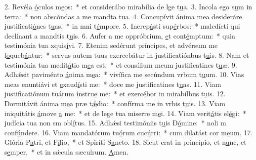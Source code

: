 2. Revéla \uline{ó}culos m\uline{e}os:~* et considerábo mirabília de lge t\uline{u}a.
3. Incola ego s\uline{u}m in t\uline{e}rra:~* non abscóndas a me mandta t\uline{u}a.
4. Concupívit ánima mea desideráre justificati\uline{ó}nes t\uline{u}as,~* in mni t\uline{é}mpore.
5. Increp\uline{á}sti sup\uline{é}rbos:~* maledícti qui declínant a mandtis t\uline{u}is.
6. Aufer a me oppróbrium, \uline{e}t cont\uline{é}mptum:~* quia testimónia tua xquis\uline{í}vi.
7. Etenim sedérunt príncipes, et advérsum me l\uline{o}queb\uline{á}ntur:~* servus autem tuus exercebátur in justificatiónbus t\uline{u}is.
8. Nam et testimónia tua medit\uline{á}tio m\uline{e}a est:~* et consílium meum justificatines t\uline{u}æ.
9. Adhǽsit paviménto \uline{á}nima m\uline{e}a:~* vivífica me secúndum vrbum t\uline{u}um.
10. Vias meas enuntiávi et \uline{e}xaud\uline{í}sti me:~* doce me justificatines t\uline{u}as.
11. Viam justificatiónum tuárum \uline{í}nstru\uline{e} me:~* et exercébor in mirabílbus t\uline{u}is.
12. Dormitávit ánima m\uline{e}a præ t\uline{ǽ}dio:~* confírma me in vrbis t\uline{u}is.
13. Viam iniquitátis \uline{á}move \uline{a} me:~* et de lege tua miserre m\uline{e}i.
14. Viam verit\uline{á}tis el\uline{é}gi:~* judícia tua non sm obl\uline{í}tus.
15. Adhǽsi testimóniis t\uline{u}is D\uline{ó}mine:~* noli m conf\uline{ú}ndere.
16. Viam mandatórum tu\uline{ó}rum cuc\uline{ú}rri:~* cum dilatást cor m\uline{e}um.
17. Glória P\uline{a}tri, et F\uline{í}lio,~* et Spiríti S\uline{a}ncto.
18. Sicut erat in princípio, et n\uline{u}nc, et s\uline{e}mper,~* et in sǽcula sæculrum. \uline{A}men.
